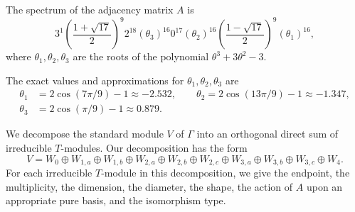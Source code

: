\documentclass[12pt,letterpaper]{article}
\begin{document}
The spectrum of the adjacency matrix $A$ is
    $$ 3^{1}\left(\frac{1+\sqrt{17}}{2}\right)^{9} 2^{18} (\theta_3)^{16} 0^{17} (\theta_2)^{16} \left(\frac{1-\sqrt{17}}{2}\right)^{9} (\theta_1)^{16},$$
    where $\theta_1, \theta_2, \theta_3$ are the roots of the polynomial $\theta^3 + 3\theta^2 - 3$.
  
    
    The exact values and approximations for $\theta_1, \theta_2,\theta_3$ are
\begin{equation}
\begin{split}
    \theta_1 &= 2\cos(7\pi/9) - 1 \approx -2.532, \quad\quad \theta_2 = 2\cos(13\pi/9) - 1 \approx -1.347, \\
    \theta_3 &= 2\cos(\pi/9) - 1 \approx 0.879.
\end{split}
\label{eq:thetas}
\end{equation}


We decompose the standard module $V$ of $\Gamma$ into an orthogonal direct sum of irreducible $T$-modules. Our decomposition has the form
\[ V = W_0 \oplus W_{1,a} \oplus W_{1,b} \oplus W_{2,a} \oplus W_{2,b} \oplus W_{2,c} \oplus W_{3,a} \oplus W_{3,b} \oplus W_{3,c} \oplus W_4. \]
For each irreducible $T$-module in this decomposition, we give the endpoint, the multiplicity, the dimension, the diameter, the shape, the action of $A$ upon an appropriate pure basis, and the isomorphism type.



\end{document}
